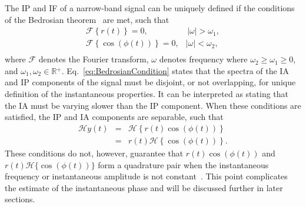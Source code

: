 \documentclass[journal,11pt,a4paper,onecolumn,draftcls]{IEEEtran}
\begin{document}
The IP and IF of a narrow-band signal can be uniquely defined if the conditions of the Bedrosian theorem~\cite{Bedrosian1963} are met, such that
\begin{equation}\label{eq:BedrosianCondition}
\begin{array}{*{20}{c}}
   {\mathcal{F}\left\{ {r\left( t \right)} \right\} = 0,} & {\,\left| \omega \right| > \omega_1,}  \\
   {\mathcal{F}\left\{ {\cos\left(\phi \left( t \right)\right)} \right\} = 0,} & {\left| \omega \right| < \omega_2,}  \\
\end{array}
\end{equation}
where $\mathcal{F}$ denotes the Fourier transform, $\omega$ denotes frequency where $\omega_2 \ge \omega_1 \ge 0$, and $\omega_1,\omega_2 \in \mathbb{R}{^ + }$. Eq.~\ref{eq:BedrosianCondition} states that the spectra of the IA and IP components of the signal must be disjoint, or not overlapping, for unique definition of the instantaneous properties. It can be interpreted as stating that the IA must be varying slower than the IP component. When these conditions are satisfied, the IP and IA components are separable, such that
\begin{eqnarray}\label{eq:SepAmpandPhase}
   \mathcal{H}y\left( t \right) &=& \mathcal{H}\left\{ {r\left( t \right)\cos \left( {\phi \left( t \right)} \right)} \right\} \nonumber \\
   &=& r\left( t \right)\mathcal{H}\left\{ {\cos \left( {\phi \left( t \right)} \right)} \right\}.
\end{eqnarray}
These conditions do not, however, guarantee that $r\left(t\right)\cos(\phi(t))$ and $r\left(t\right)\mathcal{H}\{\cos(\phi(t))\}$ form a quadrature pair when the instantaneous frequency or instantaneous amplitude is not constant~\cite{Nuttall1966}. This point complicates the estimate of the instantaneous phase and will be discussed further in later sections. 
\end{document}
